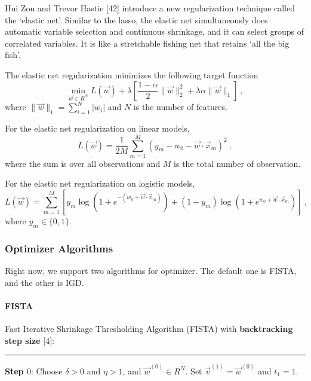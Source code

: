 Hui Zou and Trevor Hastie [42] introduce a new regularization
technique called the `elastic net'. Similar to the lasso, the elastic net
simultaneously does automatic variable selection and continuous
shrinkage, and it can select groups of correlated variables. It is like a
stretchable fishing net that retains `all the big fish'.

The elastic net regularization minimizes the following target function
\begin{equation} \label{eq:target}
\min_{\vec{w} \in R^N}L(\vec{w}) + \lambda \left[\frac{1-\alpha}{2}\|\vec{w}\|_2^2 +
  \lambda\alpha \|\vec{w}\|_1\right]\ ,
\end{equation}
where $\|\vec{w}\|_1 = \sum_{i=1}^N|w_i|$ and $N$ is the number of features.

For the elastic net regularization on linear models,
\begin{equation}
L(\vec{w}) = \frac{1}{2M}\sum_{m=1}^M\left(y_m - w_0 - \vec{w} \cdot
  \vec{x}_m\right)^2\ ,
\end{equation}
where the sum is over all observations and $M$ is the total number of
observation.

For the elastic net regularization on logistic models,
\begin{equation}
L(\vec{w}) = \sum_{m=1}^M\left[y_m \log\left(1 + e^{-(w_0 +
      \vec{w}\cdot\vec{x}_m)}\right) + (1-y_m) \log\left(1 + e^{w_0 +
      \vec{w}\cdot\vec{x}_m}\right)\right]\ ,
\end{equation}
where $y_m \in \{0,1\}$.

\subsubsection{Optimizer Algorithms}
Right now, we support two algorithms for optimizer. The default one is
FISTA, and the other is IGD.

\paragraph{FISTA}

Fast Iterative Shrinkage Thresholding Algorithm (FISTA) with
\textbf{backtracking step size} [4]:
\vspace{0.2in}
\hrule
\vspace{0.2in}
\textbf{Step $0$}: Choose $\delta>0$ and $\eta > 1$, and
$\vec{w}^{(0)} \in R^N$. Set $\vec{v}^{(1)}=\vec{w}^{(0)}$ and
$t_1=1$.

